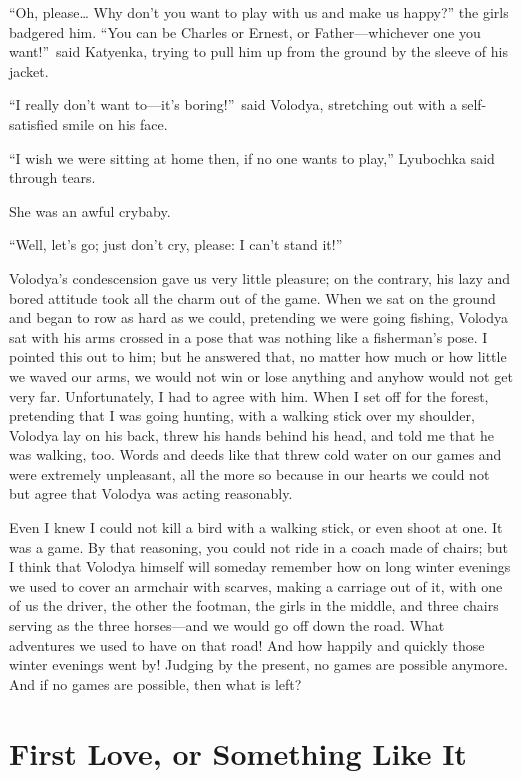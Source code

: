 ``Oh, please\ldots{} Why don't you want to play with us and make us happy?'' the girls badgered him. ``You can be Charles or Ernest, or Father---whichever one you want!''~said Katyenka, trying to pull him up from the ground by the sleeve of his jacket. %

``I really don't want to---it's boring!''~said Volodya, stretching out with a self-satisfied smile on his face.

``I wish we were sitting at home then, if no one wants to play,'' Lyubochka said through tears. %

She was an awful crybaby.

``Well, let's go; just don't cry, please: I can't stand it!'' %

Volodya's condescension gave us very little pleasure; on the contrary, his lazy and bored attitude took all the charm out of the game. When we sat on the ground and began to row as hard as we could, pretending we were going fishing, Volodya sat with his arms crossed in a pose that was nothing like a fisherman's pose. I pointed this out to him; but he answered that, no matter how much or how little we waved our arms, we would not win or lose anything and anyhow would not get very far. Unfortunately, I had to agree with him. When I set off for the forest, pretending that I was going hunting, with a walking stick over my shoulder, Volodya lay on his back, threw his hands behind his head, and told me that he was walking, too. Words and deeds like that threw cold water on our games and were extremely unpleasant, all the more so because in our hearts we could not but agree that Volodya was acting reasonably.

Even I knew I could not kill a bird with a walking stick, or even shoot at one. It was a game. By that reasoning, you could not ride in a coach made of chairs; but I think that Volodya himself will someday remember how on long winter evenings we used to cover an armchair with scarves, making a carriage out of it, with one of us the driver, the other the footman, the girls in the middle, and three chairs serving as the three horses---and we would go off down the road. What adventures we used to have on that road! And how happily and quickly those winter evenings went by! Judging by the present, no games are possible anymore. And if no games are possible, then what is left?

\chapter{First Love, or Something Like It} %

